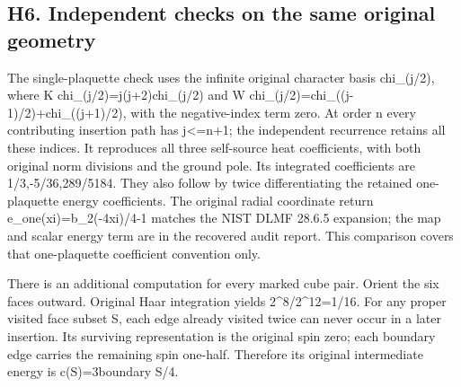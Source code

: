 \documentclass[11pt,a4paper]{article}
\renewcommand{\[}{\begingroup\small\originaldisplaystart}
\renewcommand{\]}{\originaldisplayend\endgroup}
\begin{document}
\subsection{H6. Independent checks on the same original
geometry}\label{h6.-independent-checks-on-the-same-original-geometry}

The single-plaquette check uses the infinite original character basis
chi\_(j/2), where K
{c\allowbreak{}h\allowbreak{}i\allowbreak{}\_\allowbreak{}(\allowbreak{}j\allowbreak{}/\allowbreak{}2\allowbreak{})\allowbreak{}=\allowbreak{}j\allowbreak{}(\allowbreak{}j\allowbreak{}+\allowbreak{}2\allowbreak{})\allowbreak{}c\allowbreak{}h\allowbreak{}i\allowbreak{}\_\allowbreak{}(\allowbreak{}j\allowbreak{}/\allowbreak{}2\allowbreak{})\allowbreak{}}
and W
{c\allowbreak{}h\allowbreak{}i\allowbreak{}\_\allowbreak{}(\allowbreak{}j\allowbreak{}/\allowbreak{}2\allowbreak{})\allowbreak{}=\allowbreak{}c\allowbreak{}h\allowbreak{}i\allowbreak{}\_\allowbreak{}(\allowbreak{}(\allowbreak{}j\allowbreak{}-\allowbreak{}1\allowbreak{})\allowbreak{}/\allowbreak{}2\allowbreak{})\allowbreak{}+\allowbreak{}c\allowbreak{}h\allowbreak{}i\allowbreak{}\_\allowbreak{}(\allowbreak{}(\allowbreak{}j\allowbreak{}+\allowbreak{}1\allowbreak{})\allowbreak{}/\allowbreak{}2\allowbreak{})\allowbreak{},\allowbreak{}}
with the negative-index term zero. At order n every contributing
insertion path has j\textless=n+1; the independent recurrence retains
all these indices. It reproduces all three self-source heat
coefficients, with both original norm divisions and the ground pole. Its
integrated coefficients are
{1\allowbreak{}/\allowbreak{}3\allowbreak{},\allowbreak{}-\allowbreak{}5\allowbreak{}/\allowbreak{}3\allowbreak{}6\allowbreak{},\allowbreak{}2\allowbreak{}8\allowbreak{}9\allowbreak{}/\allowbreak{}5\allowbreak{}1\allowbreak{}8\allowbreak{}4\allowbreak{}.\allowbreak{}}
They also follow by twice differentiating the retained one-plaquette
energy coefficients. The original radial coordinate return
{e\allowbreak{}\_\allowbreak{}o\allowbreak{}n\allowbreak{}e\allowbreak{}(\allowbreak{}x\allowbreak{}i\allowbreak{})\allowbreak{}=\allowbreak{}b\allowbreak{}\_\allowbreak{}2\allowbreak{}(\allowbreak{}-\allowbreak{}4\allowbreak{}x\allowbreak{}i\allowbreak{})\allowbreak{}/\allowbreak{}4\allowbreak{}-\allowbreak{}1\allowbreak{}}
matches the NIST DLMF 28.6.5 expansion; the map and scalar energy term
are in the recovered audit report. This comparison covers that
one-plaquette coefficient convention only.

There is an additional computation for every marked cube pair. Orient
the six faces outward. Original Haar integration yields
2\^{}8/2\^{}12=1/16. For any proper visited face subset S, each edge
already visited twice can never occur in a later insertion. Its
surviving representation is the original spin zero; each boundary edge
carries the remaining spin one-half. Therefore its original intermediate
energy is c(S)=3\textbar boundary S\textbar/4.
\end{document}
